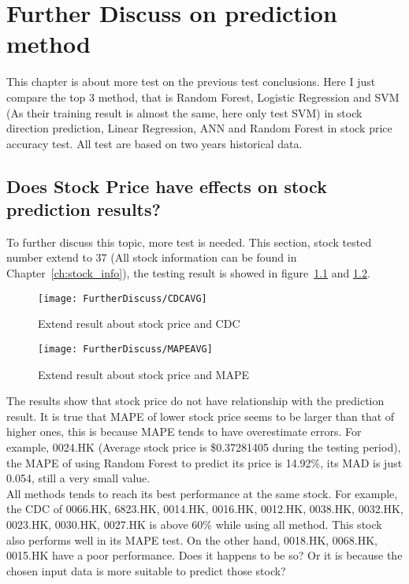 \chapter{Further Discuss on prediction method}
\label{ch:futuerDiscuss}


This chapter is about more test on the previous test conclusions. Here I just compare the top 3 method, that is Random Forest, Logistic Regression and SVM (As their training result is almost the same, here only test SVM) in stock direction prediction, Linear Regression, ANN and Random Forest in stock price accuracy test. All test are based on two years historical data. 

\section{Does Stock Price have effects on stock prediction results?}
\label{sec:priceInfluence}
To further discuss this topic, more test is needed. This section, stock tested number extend to 37 (All stock information can be found in Chapter~\ref{ch:stock_info}), the testing result is showed in figure~\ref{fg:furtherCDC} and \ref{fg:furtherMAPE}. 


\begin{figure}[h]
	\centering
	\texttt{[image: FurtherDiscuss/CDCAVG]}
	\caption{Extend result about stock price and CDC}
	\label{fg:furtherCDC}
\end{figure}


\begin{figure}[h]
	\centering
	\texttt{[image: FurtherDiscuss/MAPEAVG]}
	\caption{Extend result about stock price and MAPE}
	\label{fg:furtherMAPE}
\end{figure}
\clearpage

The results show that stock price do not have relationship with the prediction result. It is true that MAPE of lower stock price seems to be larger than that of higher ones, this is because MAPE tends to have overestimate errors. For example, 0024.HK (Average stock price is \$0.37281405 during the testing period), the MAPE of using Random Forest to predict its price is 14.92\%, its MAD is just 0.054, still a very small value.\\


All methods tends to reach its best performance at the same stock. For example, the CDC of 0066.HK, 6823.HK, 0014.HK, 0016.HK, 0012.HK, 0038.HK, 0032.HK, 0023.HK, 0030.HK, 0027.HK is above 60\% while using all method. This stock also performs well in its MAPE test. On the other hand, 0018.HK, 0068.HK, 0015.HK have a poor performance. Does it happens to be so? Or it is because the chosen input data is more suitable to predict those stock?


